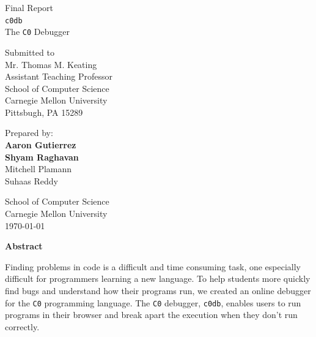 \documentclass[11pt]{article}
\begin{document}
\setlength{\parindent}{2em}



\begin{titlepage}
\clearpage
\thispagestyle{empty}

\begin{center}
{\Huge Final Report}\\
\vspace{10 mm}
{\Huge {\tt c0db}\\[.4em]
The {\tt C0} Debugger}\\
\vspace{10 mm}

Submitted to\\
Mr. Thomas M. Keating\\
Assistant Teaching Professor\\
School of Computer Science\\
Carnegie Mellon University\\
Pittsbugh, PA 15289

\vspace{10 mm}

Prepared by:\\
{\bf Aaron Gutierrez}\\
{\bf Shyam Raghavan}\\
Mitchell Plamann\\
Suhaas Reddy

\vspace{10 mm}

School of Computer Science\\
Carnegie Mellon University\\
\today

\vspace{10 mm}

{\bf Abstract}
\end{center}
\par
Finding problems in code is a difficult and time consuming task, one especially
difficult for programmers learning a new language. To help students more quickly
find bugs and understand how their programs run, we created an online debugger
for the {\tt C0} programming language. The {\tt C0} debugger, {\tt c0db},
enables users to run programs in their browser and break apart the execution
when they don't run correctly.
\end{titlepage}

\tableofcontents
\newpage

\end{document}
